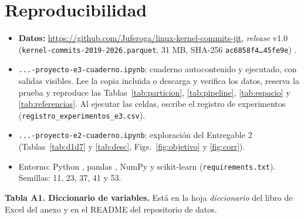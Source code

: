 \section{Reproducibilidad}
\label{ap:repro}
\begin{itemize}
\item \textbf{Datos:} \url{https://github.com/Juferoga/linux-kernel-commits-jit}, \emph{release} v1.0 (\texttt{kernel-commits-2019-2026.parquet}, 31 MB, SHA-256 \texttt{ac6858f4\ldots45fe9e}) \cite{DatosKernel2026}.
\item \texttt{...-proyecto-e3-cuaderno.ipynb}: cuaderno autocontenido y ejecutado, con salidas visibles. Lee la copia incluida o descarga y verifica los datos, reserva la prueba y reproduce las Tablas~\ref{tab:particion}, \ref{tab:pipeline}, \ref{tab:espacio} y \ref{tab:referencias}. Al ejecutar las celdas, escribe el registro de experimentos (\texttt{registro\_experimentos\_e3.csv}).
\item \texttt{...-proyecto-e2-cuaderno.ipynb}: exploración del Entregable 2 (Tablas~\ref{tab:d1d7} y \ref{tab:desc}, Figs.~\ref{fig:objetivo} y \ref{fig:corr}).
\item Entorno: Python \cifEtresPython{}, pandas \cifEtresPandas{}, NumPy \cifEtresNumpy{} y scikit-learn \cifEtresSklearn{} (\texttt{requirements.txt}). Semillas: 11, 23, 37, 41 y 53.
\end{itemize}

\textbf{Tabla A1. Diccionario de variables.} Está en la hoja \emph{diccionario} del libro de Excel del anexo y en el README del repositorio de datos.
